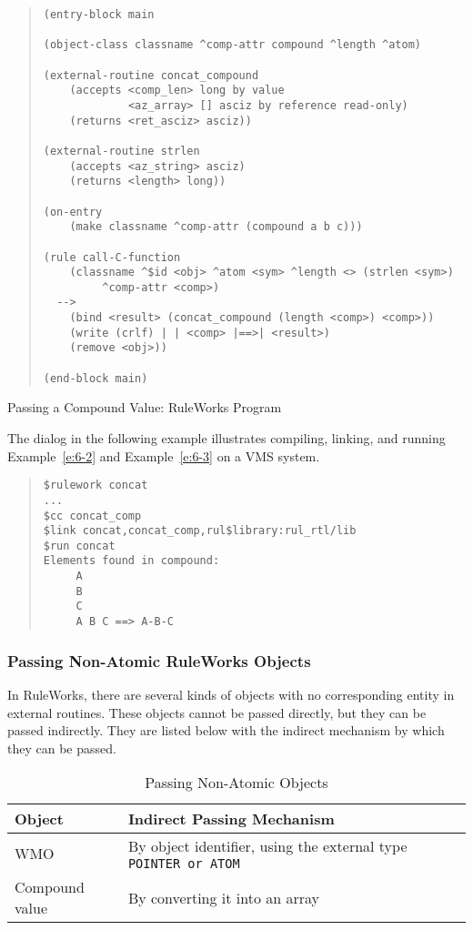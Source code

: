 \begin{example}[h]
\begin{quote}
\begin{verbatim}
(entry-block main

(object-class classname ^comp-attr compound ^length ^atom)

(external-routine concat_compound
    (accepts <comp_len> long by value
             <az_array> [] asciz by reference read-only)
    (returns <ret_asciz> asciz))

(external-routine strlen
    (accepts <az_string> asciz)
    (returns <length> long))

(on-entry
    (make classname ^comp-attr (compound a b c)))

(rule call-C-function
    (classname ^$id <obj> ^atom <sym> ^length <> (strlen <sym>)
         ^comp-attr <comp>)
  -->
    (bind <result> (concat_compound (length <comp>) <comp>))
    (write (crlf) | | <comp> |==>| <result>)
    (remove <obj>))

(end-block main)
\end{verbatim}
\end{quote}
\caption{Passing a Compound Value: RuleWorks Program}
\label{e:6-3}
\end{example}

The dialog in the following example illustrates compiling, linking,
and running Example~\ref{e:6-2} and Example~\ref{e:6-3} on a VMS
system.

\begin{quote}
\begin{verbatim}
$rulework concat
...
$cc concat_comp
$link concat,concat_comp,rul$library:rul_rtl/lib
$run concat
Elements found in compound:
     A
     B
     C
     A B C ==> A-B-C
\end{verbatim}
\end{quote}

\subsubsection{Passing Non-Atomic RuleWorks Objects}

In RuleWorks, there are several kinds of objects with no corresponding
entity in external routines. These objects cannot be passed directly,
but they can be passed indirectly. They are listed below with the
indirect mechanism by which they can be passed.

\begin{table}[h]
  \begin{tabularx}{\columnwidth}{lX}
    \toprule
    Object & Indirect Passing Mechanism \\
    \midrule
    WMO & By object identifier, using the external type
          \tt{POINTER} or \tt{ATOM} \\
    Compound value & By converting it into an array \\
    \bottomrule
  \end{tabularx}
  \caption{Passing Non-Atomic Objects}
  \label{t:6-2}
\end{table}

